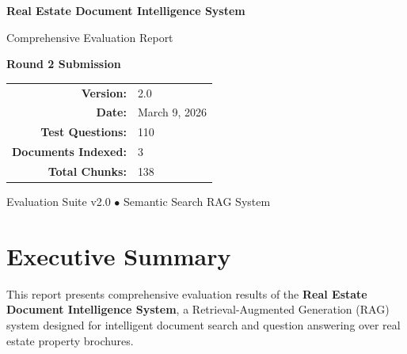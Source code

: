 \documentclass[11pt,a4paper]{article}
\begin{document}
\begin{titlepage}
    \centering
    \vspace*{2cm}
    
    {\Huge\bfseries Real Estate Document Intelligence System}
    
    \vspace{0.5cm}
    {\LARGE Comprehensive Evaluation Report}
    
    \vspace{1.5cm}
    
    
    \vspace{1.5cm}
    
    {\Large\textbf{Round 2 Submission}}
    
    \vspace{2cm}
    
    \begin{tabular}{rl}
        \textbf{Version:} & 2.0 \\
        \textbf{Date:} & March 9, 2026 \\
        \textbf{Test Questions:} & 110 \\
        \textbf{Documents Indexed:} & 3 \\
        \textbf{Total Chunks:} & 138 \\
    \end{tabular}
    
    \vfill
    
    
    \vspace{0.5cm}
    {\small Evaluation Suite v2.0 $\bullet$ Semantic Search RAG System}
\end{titlepage}

\tableofcontents
\newpage

\section{Executive Summary}

This report presents comprehensive evaluation results of the \textbf{Real Estate Document Intelligence System}, a Retrieval-Augmented Generation (RAG) system designed for intelligent document search and question answering over real estate property brochures.
\end{document}
